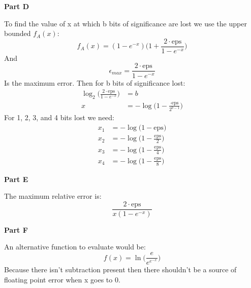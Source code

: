 \documentclass[12pt]{article}
\begin{document}
\noindent
\textbf{Part D}

To find the value of x at which b bits of significance are lost we use the upper bounded $f_A(x)$:
\[
f_A(x) = (1 - e^{-x}) \bigg(1 + \frac{2 \cdot \mathrm{eps}}{1 - e^{-x}}\bigg)
\]
And
\[
\epsilon_{max} = \frac{2 \cdot \mathrm{eps}}{1 - e^{-x}}
\]
Is the maximum error. Then for b bits of significance lost:
\begin{align*}
\log_2\bigg( \frac{2 \cdot \mathrm{eps}}{1 - e^{-x}}\bigg) &= b
\\
x &= -\log \bigg(1 - \frac{\cdot \mathrm{eps}}{2^{b-1}}\bigg)
\end{align*}
For 1, 2, 3, and 4 bits lost we need:
\begin{align*}
x_1 &= -\log \bigg(1 - \mathrm{eps}\bigg)
\\
x_2 &= -\log \bigg(1 - \frac{\mathrm{eps}}{2}\bigg)
\\
x_3 &= -\log \bigg(1 - \frac{\mathrm{eps}}{4}\bigg)
\\
x_4 &= -\log \bigg(1 - \frac{\mathrm{eps}}{8}\bigg)
\end{align*}

\noindent
\textbf{Part E}

The maximum relative error is:
\[
\frac{2 \cdot \mathrm{eps}}{x(1 - e^{-x})}
\]

\noindent
\textbf{Part F}

An alternative function to evaluate would be:
\[
f(x) = \ln \bigg(\frac{e}{e^{e^{-x}}} \bigg)
\]
Because there isn't subtraction present then there shouldn't be a source of floating point error when x goes to 0.
\end{document}
